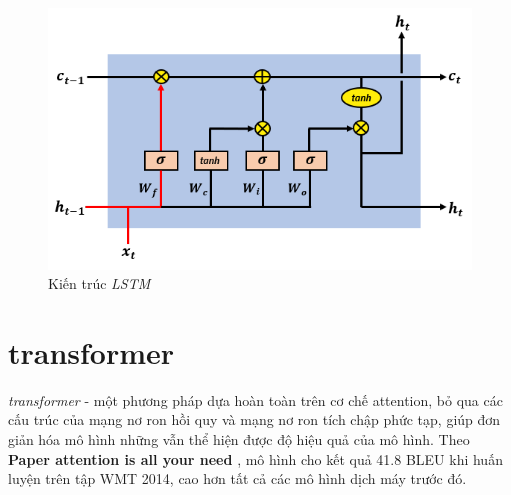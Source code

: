 \begin{figure}[H]
    \begin{center}
        \includegraphics[scale=0.6]{images/lstm}
        \caption{Kiến trúc \textit{LSTM}}
        \label{fig:lstm}
    \end{center}
\end{figure}

\section{transformer}

\textit{transformer}\cite{transformer} - một phương pháp dựa hoàn toàn trên cơ chế attention, bỏ qua các cấu trúc của mạng nơ ron hồi quy và mạng nơ ron tích chập phức tạp, giúp đơn giản hóa mô hình những vẫn thể hiện được độ hiệu quả của mô hình. Theo \textbf{Paper attention is all your need} \cite{transformer}, mô hình cho kết quả 41.8 BLEU khi huấn luyện trên tập WMT 2014, cao hơn tất cả các mô hình dịch máy trước đó. 

